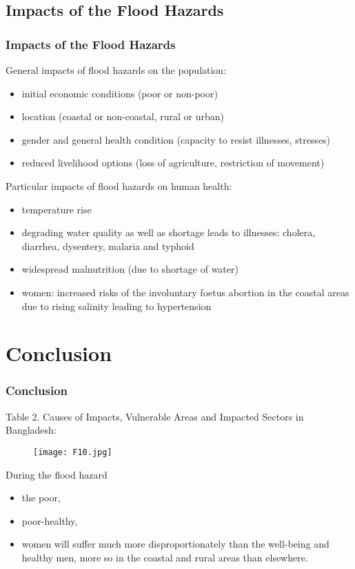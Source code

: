 \documentclass[pdflatex,compress,8pt,
	xcolor={dvipsnames,dvipsnames,svgnames,x11names,table},
	hyperref={colorlinks = true,breaklinks = true, urlcolor = NavyBlue, breaklinks = true}]{beamer}
\begin{document}
\subsection{Impacts of the Flood Hazards}
\begin{frame}\frametitle{Impacts of the Flood Hazards}
General impacts of flood hazards on the population:
\begin{itemize}
	\item initial economic conditions (poor or non-poor)
	\item location (coastal or non-coastal, rural or urban)
	\item gender and general health condition (capacity to resist illnesses, stresses)
	\item reduced livelihood options (loss of agriculture, restriction of movement)
\end{itemize}
Particular impacts of flood hazards on human health:
\begin{itemize}
	\item temperature rise
	\item degrading water quality as well as shortage leads to illnesses: cholera, diarrhea, dysentery, malaria and typhoid
	\item widespread malnutrition (due to shortage of water)
	\item women: increased risks of the involuntary foetus abortion in the coastal areas due to rising salinity leading to hypertension
\end{itemize}
\begin{figure}[H]
	\centering
			\hspace{5mm}
\end{figure}
\end{frame} 

\section{Conclusion}
\begin{frame}\frametitle{Conclusion}
Table 2. Causes of Impacts, Vulnerable Areas and Impacted Sectors in Bangladesh:
\begin{figure}[H]
	\centering
		\texttt{[image: F10.jpg]}
\end{figure}


During the flood hazard 
\begin{itemize}
	\item the poor, 
	\item poor-healthy, 
	\item women will suffer much more disproportionately than the well-being and healthy men, more so in the coastal and rural areas than elsewhere.
\end{itemize}
\end{frame}
\end{document}
